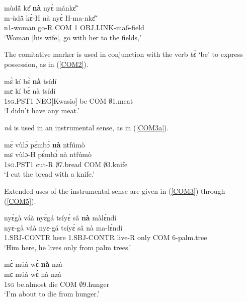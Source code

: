 \begin{exe} 
\ex\label{COM1}
  \glll mùdã̂ kɛ̂ {\bfseries nà} nyɛ̀ mánkɛ̃̂ \\
       m-ùdã̂ kɛ̀-H nà nyɛ̀ H-ma-nkɛ̃̂ \\
         n1-woman go-R COM 1 OBJ.LINK-ma6-field  \\
    \trans `Woman [his wife], go with her to the fields,'
\end{exe}

The comitative marker is used in conjunction with the verb {\itshape bɛ̀} `be' to express possession, as in (\ref{COM2}).

\begin{exe} 
\ex\label{COM2}
  \glll mɛ̀ kí bɛ̀ {\bfseries nà} tsídí \\
       mɛ kí bɛ̀ nà tsídí \\
       1\textsc{sg}.PST1 NEG[Kwasio] be COM $\emptyset$1.meat  \\
    \trans `I didn't have any meat.'
\end{exe}

{\itshape nà} is used in an instrumental sense, as in (\ref{COM3a}).

\begin{exe} 
\ex\label{COM3a}
  \glll mɛ̀ vùlɔ́ pɛ́mbɔ́ {\bfseries nà} ntfúmò \\
       mɛ vùlɔ-H pɛ́mbɔ́ nà ntfúmò  \\
       1\textsc{sg}.PST1 cut-R $\emptyset$7.bread COM $\emptyset$3.knife  \\
    \trans `I cut the bread with a knife.'
\end{exe}

\noindent Extended uses of the instrumental sense are given in (\ref{COM3}) through (\ref{COM5}).

\begin{exe} 
\ex\label{COM3}
  \glll nyɛ̀gà váà nyɛ̀gá tsíyɛ́ sâ {\bfseries nà} màlɛ́ndí \\
         nyɛ-gà váà nyɛ-gá tsíyɛ́ sâ nà ma-lɛ́ndí \\
          1.SBJ-CONTR here 1.SBJ-CONTR live-R only COM 6-palm.tree \\
    \trans `Him here, he lives only from palm trees.'
\end{exe}

\begin{exe} 
\ex\label{COM4}
  \glll  mɛ̀ múà wɛ̀ {\bfseries nà} nzà \\
        mɛ múà wɛ̀ nà nzà \\
          1\textsc{sg} be.almost die COM $\emptyset$9.hunger  \\
    \trans `I'm about to die from hunger.'
\end{exe}

